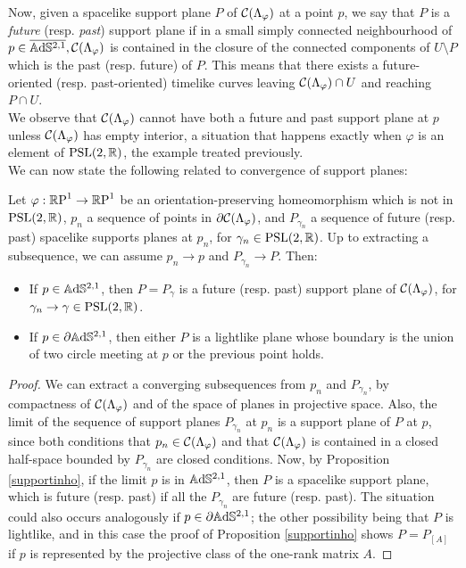 Now, given a spacelike support plane $P$ of $\CF$ at a point $p$, we say that $P$ is a \textit{future} (resp. \textit{past}) support plane if in a small simply connected neighbourhood of $p\in\overline{\A^{2,1}}, \CF$ is contained in the closure of the connected components of $U\setminus P$ which is the past (resp. future) of $P$. This means that there exists a future-oriented (resp. past-oriented) timelike curves leaving $\CF\cap U$ and reaching $P\cap U$. \\
We observe that $\CF$ cannot have both a future and past support plane at $p$ unless $\CF$ has empty interior, a situation that happens exactly when $\varphi$ is an element of $\PSL$, the example treated previously.\\
We can now state the following related to convergence of support planes: 
\begin{lemma}\label{49}
    Let $\varphi:\S\to\S$ be an orientation-preserving homeomorphism which is not in $\PSL$, $p_n$ a sequence of points in $\partial\CF$, and $P_{\gamma_n}$ a sequence of future (resp. past) spacelike supports planes at $p_n$, for $\gamma_n\in\PSL$. Up to extracting a subsequence, we can assume $p_n\to p$ and $P_{\gamma_n}\to P.$ Then: 
    \begin{itemize}
        \item If $p\in\A^{2,1}$, then $P=P_\gamma$ is a future (resp. past) support plane of $\CF$, for $\gamma_n\to\gamma\in\PSL$.
        \item If $p\in\partial\A^{2,1}$, then either $P$ is a lightlike plane whose boundary is the union of two circle meeting at $p$ or the previous point holds.        
    \end{itemize}
\end{lemma}
\begin{proof}
We can extract a converging subsequences from $p_{n}$ and $P_{\gamma_n}$, by compactness of $\CF$ and of the space of planes in projective space. Also, the limit of the sequence of support planes $P_{\gamma_n}$ at $p_n$ is a support plane of $P$ at $p$, since both conditions that $p_n\in\CF$ and that $\CF$ is contained in a closed half-space bounded by $P_{\gamma_n}$ are closed conditions. Now, by Proposition \ref{supportinho}, if the limit $p$ is in $\A^{2,1}$, then $P$ is a spacelike support plane, which is future (resp. past) if all the $P_{\gamma_n}$ are future (resp. past). The situation could also occurs analogously if $p\in\partial\A^{2,1}$; the other possibility being that $P$ is lightlike, and in this case the proof of Proposition \ref{supportinho} shows $P=P_{[A]}$ if $p$ is represented by the projective class of the one-rank matrix $A$.
\end{proof}
